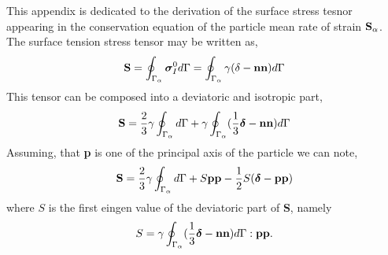 
This appendix is dedicated to the derivation of the surface stress tesnor appearing in the conservation equation of the particle mean rate of strain $\textbf S_\alpha$. 
The surface tension stress tensor may be written as, 
\begin{equation*}
    \textbf{S} 
    = \oint_{\Gamma_{\alpha}} \bm\sigma_I^0 d\Gamma
    = \oint_{\Gamma_{\alpha}} \gamma (\delta - \textbf{nn}) d\Gamma
\end{equation*}
This tensor can be composed into a deviatoric and isotropic part, 
\begin{equation*}
    \textbf{S} 
    = 
    \frac{2}{3}\gamma\oint_{\Gamma_{\alpha}}  d\Gamma
    +\gamma \oint_{\Gamma_{\alpha}}  (\frac{1}{3}\bm\delta - \textbf{nn}) d\Gamma 
\end{equation*}
Assuming, that  \textbf{p} is one of the principal axis of the particle we can note, 
\begin{equation*}
    \textbf{S} 
    = 
    \frac{2}{3}\gamma\oint_{\Gamma_{\alpha}}  d\Gamma
    + S \textbf{pp} - \frac{1}{2}S (\bm\delta - \textbf{pp})
\end{equation*}
where $S$ is the first eingen value of the deviatoric part of  \textbf{S}, namely
\begin{equation*}
    S = \gamma \oint_{\Gamma_{\alpha}}  (\frac{1}{3}\bm\delta - \textbf{nn}) d\Gamma : \textbf{pp}.
\end{equation*}



